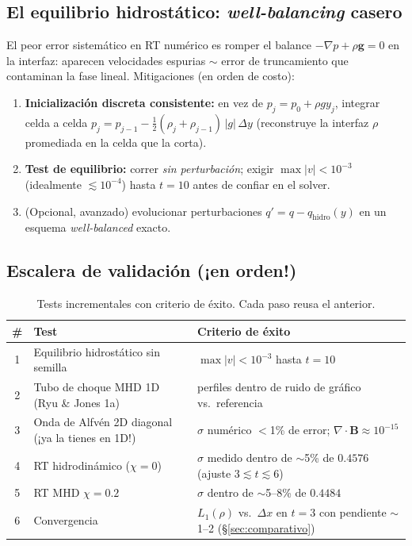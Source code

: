 \documentclass[11pt,a4paper]{article}
\newcommand{\B}{\mathbf{B}}
\begin{document}
\subsection{El equilibrio hidrostático: \emph{well-balancing} casero}

El peor error sistemático en RT numérico es romper el balance $-\nabla p+\rho\mathbf{g}=0$
en la interfaz: aparecen velocidades espurias $\sim$ error de truncamiento que contaminan la
fase lineal. Mitigaciones (en orden de costo):

\begin{enumerate}[nosep]
  \item \textbf{Inicialización discreta consistente:} en vez de $p_j=p_0+\rho g y_j$,
  integrar celda a celda $p_{j}=p_{j-1} - \tfrac12(\rho_j+\rho_{j-1})\,|g|\,\Delta y$
  (reconstruye la interfaz $\rho$ promediada en la celda que la corta).
  \item \textbf{Test de equilibrio:} correr \emph{sin perturbación}; exigir
  $\max|v|<10^{-3}$ (idealmente $\lesssim10^{-4}$) hasta $t=10$ antes de confiar en el solver.
  \item (Opcional, avanzado) evolucionar perturbaciones $q'=q-q_\mathrm{hidro}(y)$ en un
  esquema \emph{well-balanced} exacto.
\end{enumerate}

\subsection{Escalera de validación (¡en orden!)}

\begin{table}[htbp]
\centering\small
\caption{Tests incrementales con criterio de éxito. Cada paso reusa el anterior.}
\begin{tabular}{@{}clp{7.2cm}@{}}
\toprule
\# & Test & Criterio de éxito \\
\midrule
1 & Equilibrio hidrostático sin semilla & $\max|v|<10^{-3}$ hasta $t=10$ \\
2 & Tubo de choque MHD 1D (Ryu \& Jones 1a) & perfiles dentro de ruido de gráfico vs.\ referencia \\
3 & Onda de Alfvén 2D diagonal (¡ya la tienes en 1D!) & $\sigma$ numérico $<$1\% de error; $\nabla\cdot\B\approx10^{-15}$ \\
4 & RT hidrodinámico ($\chi=0$) & $\sigma$ medido dentro de $\sim$5\% de $0.4576$ (ajuste $3\lesssim t\lesssim6$) \\
5 & RT MHD $\chi=0.2$ & $\sigma$ dentro de $\sim$5--8\% de $0.4484$ \\
6 & Convergencia & $L_1(\rho)$ vs.\ $\Delta x$ en $t=3$ con pendiente $\sim$1--2 (§\ref{sec:comparativo}) \\
\bottomrule
\end{tabular}
\end{table}
\end{document}
